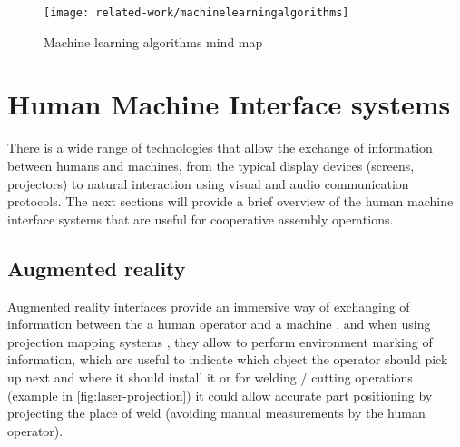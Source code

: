 \begin{figure}[H]
	\centering
	\texttt{[image: related-work/machinelearningalgorithms]}
	\caption[Machine learning algorithms mind map]{Machine learning algorithms mind map\protect\footnotemark}
	\label{fig:machinelearningalgorithms}
\end{figure}




\section{Human Machine Interface systems}

There is a wide range of technologies that allow the exchange of information between humans and machines\cite{Goodrich2008}, from the typical display devices (screens, projectors) to natural interaction using visual and audio \cite{Yan2014} communication protocols. The next sections will provide a brief overview of the human machine interface systems that are useful for cooperative assembly operations.



\subsection{Augmented reality}

Augmented reality interfaces provide an immersive way of exchanging of information between the a human operator and a machine \cite{Bimber2005}, and when using projection mapping systems \cite{Tan2013,Fujimoto2014}, they allow to perform environment marking of information, which are useful to indicate which object the operator should pick up next and where it should install it or for welding / cutting operations (example in \cref{fig:laser-projection}) it could allow accurate part positioning by projecting the place of weld (avoiding manual measurements by the human operator).

